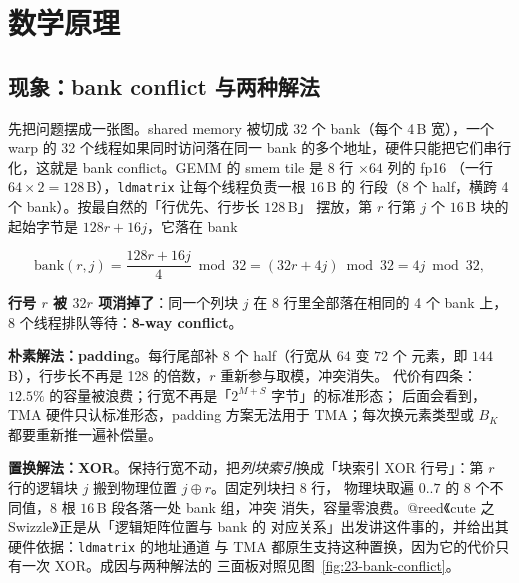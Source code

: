 \section{数学原理}

\subsection{现象：bank conflict 与两种解法}

先把问题摆成一张图。shared memory 被切成 32 个 bank（每个 4\,B 宽），一个
warp 的 32 个线程如果同时访问落在同一 bank 的多个地址，硬件只能把它们串行
化，这就是 bank conflict。GEMM 的 smem tile 是 $8$ 行 $\times 64$ 列的 fp16
（一行 $64\times2=128$\,B），\texttt{ldmatrix} 让每个线程负责一根 $16$\,B 的
行段（8 个 half，横跨 4 个 bank）。按最自然的「行优先、行步长 $128$\,B」
摆放，第 $r$ 行第 $j$ 个 $16$\,B 块的起始字节是 $128r+16j$，它落在 bank

\begin{equation}
  \label{eq:23-bank}
  \mathrm{bank}(r,j) = \frac{128r+16j}{4} \bmod 32 = (32r + 4j) \bmod 32
  = 4j \bmod 32 ,
\end{equation}

\textbf{行号 $r$ 被 $32r$ 项消掉了}：同一个列块 $j$ 在 8 行里全部落在相同的
4 个 bank 上，8 个线程排队等待：\textbf{8-way conflict}。

\textbf{朴素解法：padding}。每行尾部补 8 个 half（行宽从 $64$ 变 $72$ 个
元素，即 $144$\,B），行步长不再是 128 的倍数，$r$ 重新参与取模，冲突消失。
代价有四条：$12.5\%$ 的容量被浪费；行宽不再是「$2^{M+S}$ 字节」的标准形态；
后面会看到，TMA 硬件只认标准形态，padding 方案无法用于 TMA；每次换元素类型或
$B_K$ 都要重新推一遍补偿量。

\textbf{置换解法：XOR}。保持行宽不动，把\emph{列块索引}换成「块索引 XOR
行号」：第 $r$ 行的逻辑块 $j$ 搬到物理位置 $j\oplus r$。固定列块扫 8 行，
物理块取遍 $0..7$ 的 8 个不同值，8 根 $16$\,B 段各落一处 bank 组，冲突
消失，容量零浪费。@reed《cute 之 Swizzle》正是从「逻辑矩阵位置与 bank 的
对应关系」出发讲这件事的，并给出其硬件依据：\texttt{ldmatrix} 的地址通道
与 TMA 都原生支持这种置换，因为它的代价只有一次 XOR。成因与两种解法的
三面板对照见图~\ref{fig:23-bank-conflict}。

